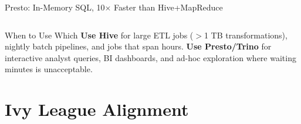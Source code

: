 \documentclass[aspectratio=169,10pt]{beamer}
\begin{document}
\begin{frame}{Presto: In-Memory SQL, 10$\times$ Faster than Hive+MapReduce}
\begin{columns}[T]
\begin{center}
      \end{center}
  \end{columns}
  \vspace{4pt}
  \begin{exampleblock}{When to Use Which}
    \small \textbf{Use Hive} for large ETL jobs ($>$1 TB transformations), nightly batch pipelines, and jobs that span hours.  \textbf{Use Presto/Trino} for interactive analyst queries, BI dashboards, and ad-hoc exploration where waiting minutes is unacceptable.
  \end{exampleblock}
\end{frame}

\section{Ivy League Alignment}
\end{document}
